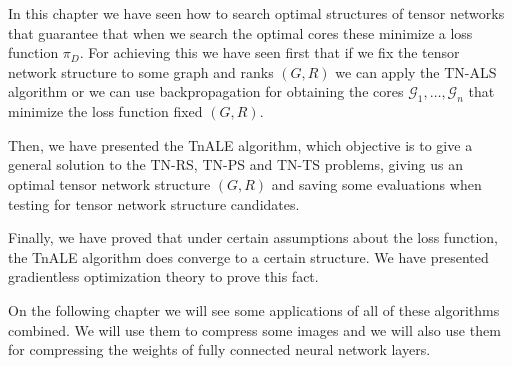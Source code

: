 \documentclass[11pt,a4paper,openright,oneside]{book}
\numberwithin{equation}{section}
\newcommand{\refeq}[1]{\cref{#1}}
\DeclareMathOperator{\TNS}{TNS}
\begin{document}
{In this chapter we have seen how to search optimal structures of tensor networks that guarantee that
when we search the optimal cores these minimize a loss function $\pi_D$. For achieving this we have
seen first that if we fix the tensor network structure to some graph and ranks $(G, R)$ we can 
apply the TN-ALS algorithm or we can use backpropagation for obtaining the cores
$\mathcal{G}_1, \dots, \mathcal{G}_n$ that minimize the loss function fixed $(G, R)$.

Then, we have presented the TnALE algorithm, which objective is to give a general solution to the
\gls{TN-RS}, \gls{TN-PS} and \gls{TN-TS} problems, giving us an optimal tensor network structure $(G, R)$ and saving
some evaluations when testing for tensor network structure candidates.

Finally, we have proved that under certain assumptions about the loss function, the TnALE algorithm
does converge to a certain structure. We have presented gradientless optimization theory to prove this fact.

On the following chapter we will see some applications of all of these algorithms combined. We will use them
to compress some images and we will also use them for compressing the weights of fully connected neural network layers.

}
\end{document}
